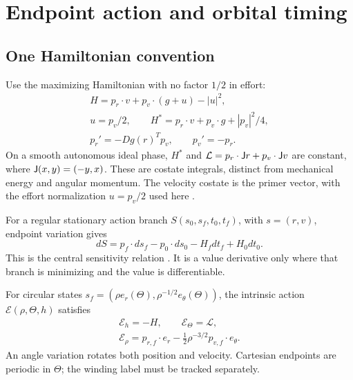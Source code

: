 \section{Endpoint action and orbital timing}
\label{sec:timing}
\subsection{One Hamiltonian convention}
Use the maximizing Hamiltonian with no factor $1/2$ in effort:
\begin{equation}
 \begin{gathered}
 H=p_r\cdot v+p_v\cdot(g+u)-|u|^2,\\
 u=p_v/2,\qquad
 H^*=p_r\cdot v+p_v\cdot g+|p_v|^2/4,\\
 p_r'=-Dg(r)^Tp_v,\qquad p_v'=-p_r.
 \end{gathered}
 \label{eq:idealPMP}
\end{equation}
On a smooth autonomous ideal phase, $H^*$ and
$\mathcal L=p_r\cdot\mathsf J r+p_v\cdot\mathsf J v$ are constant, where
$\mathsf J(x,y)=(-y,x)$. These are costate integrals, distinct from
mechanical energy and angular momentum.
The velocity costate is the primer vector, with the effort normalization
$u=p_v/2$ used here \cite{Lawden1963}.

For a regular stationary action branch
$S(s_0,s_f,t_0,t_f)$, with $s=(r,v)$, endpoint variation gives
\begin{equation}
 dS=p_f\cdot ds_f-p_0\cdot ds_0-H_fdt_f+H_0dt_0.
 \label{eq:endpoint}
\end{equation}
This is the central sensitivity relation \cite{ClarkeLoewen1986}.
It is a value derivative only where that branch is minimizing and the
value is differentiable.

For circular states
$s_f=(\rho e_r(\Theta),\rho^{-1/2}e_\theta(\Theta))$, the intrinsic
action $\mathcal E(\rho,\Theta,h)$ satisfies
\begin{equation}
 \begin{gathered}
 \mathcal E_h=-H,\qquad \mathcal E_\Theta=\mathcal L,\\
 \mathcal E_\rho=p_{r,f}\cdot e_r
 -\tfrac12\rho^{-3/2}p_{v,f}\cdot e_\theta.
 \end{gathered}
\end{equation}
An angle variation rotates both position and velocity. Cartesian
endpoints are periodic in $\Theta$; the winding label must be tracked
separately.

